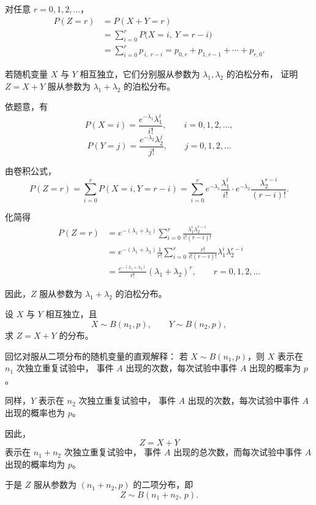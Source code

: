 \begin{solution}
对任意 $r=0,1,2,\dots$，
\[
\begin{aligned}
P(Z=r)
&=P(X+Y=r)\\
&=\sum_{i=0}^{r} P\big(X=i,\ Y=r-i\big)\\
&=\sum_{i=0}^{r} p_{\,i,\ r-i}
= p_{0,r}+p_{1,r-1}+\cdots+p_{r,0}.
\end{aligned}
\]
\end{solution}
\begin{example}[泊松分布的可加性]
若随机变量 $X$ 与 $Y$ 相互独立，它们分别服从参数为 $\lambda_1,\lambda_2$ 的泊松分布，
证明 $Z=X+Y$ 服从参数为 $\lambda_1+\lambda_2$ 的泊松分布。
\end{example}

\begin{solution}
依题意，有
\[
P(X=i)=\frac{e^{-\lambda_1}\lambda_1^i}{i!},\qquad i=0,1,2,\dots,
\]
\[
P(Y=j)=\frac{e^{-\lambda_2}\lambda_2^j}{j!},\qquad j=0,1,2,\dots
\]

由卷积公式，
\[
P(Z=r)=\sum_{i=0}^{r}P(X=i,Y=r-i)
=\sum_{i=0}^{r}e^{-\lambda_1}\frac{\lambda_1^i}{i!}\cdot e^{-\lambda_2}\frac{\lambda_2^{r-i}}{(r-i)!}.
\]

化简得
\[
\begin{aligned}
P(Z=r)
&=e^{-(\lambda_1+\lambda_2)}\sum_{i=0}^{r}\frac{\lambda_1^i\lambda_2^{r-i}}{i!(r-i)!}\\[4pt]
&=e^{-(\lambda_1+\lambda_2)}\frac{1}{r!}\sum_{i=0}^{r}\frac{r!}{i!(r-i)!}\lambda_1^i\lambda_2^{r-i}\\[4pt]
&=\frac{e^{-(\lambda_1+\lambda_2)}}{r!}(\lambda_1+\lambda_2)^r,\qquad r=0,1,2,\dots
\end{aligned}
\]

因此，$Z$ 服从参数为 $\lambda_1+\lambda_2$ 的泊松分布。
\end{solution}
\begin{example}[二项分布的可加性]
设 $X$ 与 $Y$ 相互独立，且 
\[
X \sim B(n_1,p),\qquad Y \sim B(n_2,p),
\]
求 $Z=X+Y$ 的分布。
\end{example}

\begin{solution}
回忆对服从二项分布的随机变量的直观解释：  
若 $X \sim B(n_1,p)$，则 $X$ 表示在 $n_1$ 次独立重复试验中，
事件 $A$ 出现的次数，每次试验中事件 $A$ 出现的概率为 $p$。  

同样，$Y$ 表示在 $n_2$ 次独立重复试验中，
事件 $A$ 出现的次数，每次试验中事件 $A$ 出现的概率也为 $p$。  

因此，
\[
Z=X+Y
\]
表示在 $n_1+n_2$ 次独立重复试验中，
事件 $A$ 出现的总次数，而每次试验中事件 $A$ 出现的概率均为 $p$。  

于是 $Z$ 服从参数为 $(n_1+n_2,p)$ 的二项分布，即
\[
Z \sim B(n_1+n_2,\,p).
\]
\end{solution}










